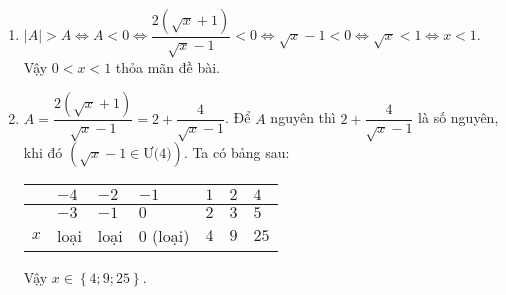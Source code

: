 \begin{ex}
{\begin{enumerate}
				\item 
					$ \left| A\right| >A \Leftrightarrow A<0 \Leftrightarrow \dfrac{2\left( \sqrt{x}+1\right) }{\sqrt{x}-1} <0 \Leftrightarrow \sqrt{x}-1 <0 \Leftrightarrow \sqrt{x} <1 \Leftrightarrow x <1. $\\
				Vậy $0<x<1$ thỏa mãn đề bài.
				\item  $A= \dfrac{2\left( \sqrt{x}+1\right) }{\sqrt{x}-1} = 2 + \dfrac{4}{\sqrt{x}-1}$. Để $A$ nguyên thì $2 + \dfrac{4}{\sqrt{x}-1}$ là số nguyên, khi đó $\left( \sqrt{x} -1 \in \text{Ư(4)}\right) $.
				Ta có bảng sau: 
					\begin{center}
					\begin{tabular}{|>{\centering\arraybackslash}p{2cm}|>{\centering\arraybackslash}p{1.5cm}|>{\centering\arraybackslash}p{1.5cm}|>{\centering\arraybackslash}p{1.5cm}|>{\centering\arraybackslash}p{1.5cm}|>{\centering\arraybackslash}p{1.5cm}|>{\centering\arraybackslash}p{1.5cm}|}
						\hline  
						{ $\sqrt{x}-1$}&$-4$  &$-2$  &$-1$  &$1$  &$2$  &$4$  \\ 
							\hline  
						{ $\sqrt{x}$}&$-3$  &$-1$  &$0$  &$2$  &$3$  &$5$  \\ 
							\hline   
						{ $x $}&loại  &loại  &$0$ (loại)  &$4$  &$9$  &$25$  \\
							\hline  
					\end{tabular} 
				\end{center}
			Vậy $x \in \left\lbrace 4;9;25 \right\rbrace $.
			\end{enumerate}
	}
\end{ex}

